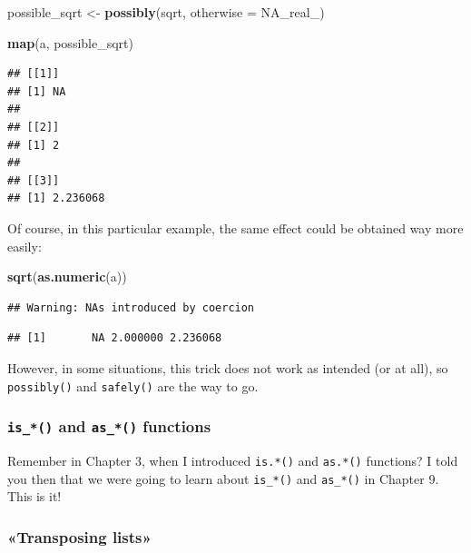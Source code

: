 \documentclass[]{gitbook}
\newenvironment{Shaded}{\begin{snugshade}}{\end{snugshade}}
\newcommand{\DataTypeTok}[1]{\textcolor[rgb]{0.13,0.29,0.53}{#1}}
\newcommand{\KeywordTok}[1]{\textcolor[rgb]{0.13,0.29,0.53}{\textbf{#1}}}
\newcommand{\NormalTok}[1]{#1}
\newcommand{\OtherTok}[1]{\textcolor[rgb]{0.56,0.35,0.01}{#1}}
\newcommand{\StringTok}[1]{\textcolor[rgb]{0.31,0.60,0.02}{#1}}
\theoremstyle{definition}
\theoremstyle{definition}
\theoremstyle{definition}
\theoremstyle{remark}
\begin{document}
\begin{Shaded}
\begin{Highlighting}[]
\NormalTok{possible_sqrt <-}\StringTok{ }\KeywordTok{possibly}\NormalTok{(sqrt, }\DataTypeTok{otherwise =} \OtherTok{NA_real_}\NormalTok{)}

\KeywordTok{map}\NormalTok{(a, possible_sqrt)}
\end{Highlighting}
\end{Shaded}

\begin{verbatim}
## [[1]]
## [1] NA
## 
## [[2]]
## [1] 2
## 
## [[3]]
## [1] 2.236068
\end{verbatim}

Of course, in this particular example, the same effect could be obtained
way more easily:

\begin{Shaded}
\begin{Highlighting}[]
\KeywordTok{sqrt}\NormalTok{(}\KeywordTok{as.numeric}\NormalTok{(a))}
\end{Highlighting}
\end{Shaded}

\begin{verbatim}
## Warning: NAs introduced by coercion
\end{verbatim}

\begin{verbatim}
## [1]       NA 2.000000 2.236068
\end{verbatim}

However, in some situations, this trick does not work as intended (or at
all), so \texttt{possibly()} and \texttt{safely()} are the way to go.

\hypertarget{is_-and-as_-functions}{%
\subsubsection{\texorpdfstring{\texttt{is\_*()} and \texttt{as\_*()}
functions}{is\_*() and as\_*() functions}}\label{is_-and-as_-functions}}

Remember in Chapter 3, when I introduced \texttt{is.*()} and
\texttt{as.*()} functions? I told you then that we were going to learn
about \texttt{is\_*()} and \texttt{as\_*()} in Chapter 9. This is it!

\hypertarget{transposing-lists}{%
\subsubsection{«Transposing lists»}\label{transposing-lists}}
\end{document}
